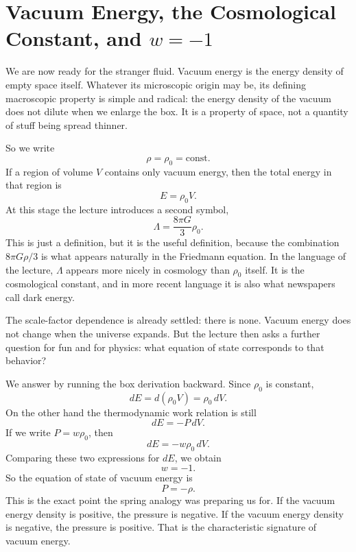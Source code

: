 \section{Vacuum Energy, the Cosmological Constant, and \(w=-1\)}

We are now ready for the stranger fluid. Vacuum energy is the energy density of empty space itself. Whatever its microscopic origin may be, its defining macroscopic property is simple and radical: the energy density of the vacuum does not dilute when we enlarge the box. It is a property of space, not a quantity of stuff being spread thinner.

So we write
\begin{equation}
\rho=\rho_0=\text{const.}
\end{equation}
If a region of volume \(V\) contains only vacuum energy, then the total energy in that region is
\begin{equation}
E=\rho_0 V.
\end{equation}
At this stage the lecture introduces a second symbol,
\begin{equation}
\Lambda=\frac{8\pi G}{3}\rho_0.
\end{equation}
This is just a definition, but it is the useful definition, because the combination \(8\pi G\rho/3\) is what appears naturally in the Friedmann equation. In the language of the lecture, \(\Lambda\) appears more nicely in cosmology than \(\rho_0\) itself. It is the cosmological constant, and in more recent language it is also what newspapers call dark energy.

The scale-factor dependence is already settled: there is none. Vacuum energy does not change when the universe expands. But the lecture then asks a further question for fun and for physics: what equation of state corresponds to that behavior?

We answer by running the box derivation backward. Since \(\rho_0\) is constant,
\begin{equation}
dE=d(\rho_0V)=\rho_0\,dV.
\end{equation}
On the other hand the thermodynamic work relation is still
\begin{equation}
dE=-P\,dV.
\end{equation}
If we write \(P=w\rho_0\), then
\begin{equation}
dE=-w\rho_0\,dV.
\end{equation}
Comparing these two expressions for \(dE\), we obtain
\begin{equation}
w=-1.
\end{equation}
So the equation of state of vacuum energy is
\begin{equation}
P=-\rho.
\end{equation}
This is the exact point the spring analogy was preparing us for. If the vacuum energy density is positive, the pressure is negative. If the vacuum energy density is negative, the pressure is positive. That is the characteristic signature of vacuum energy.

